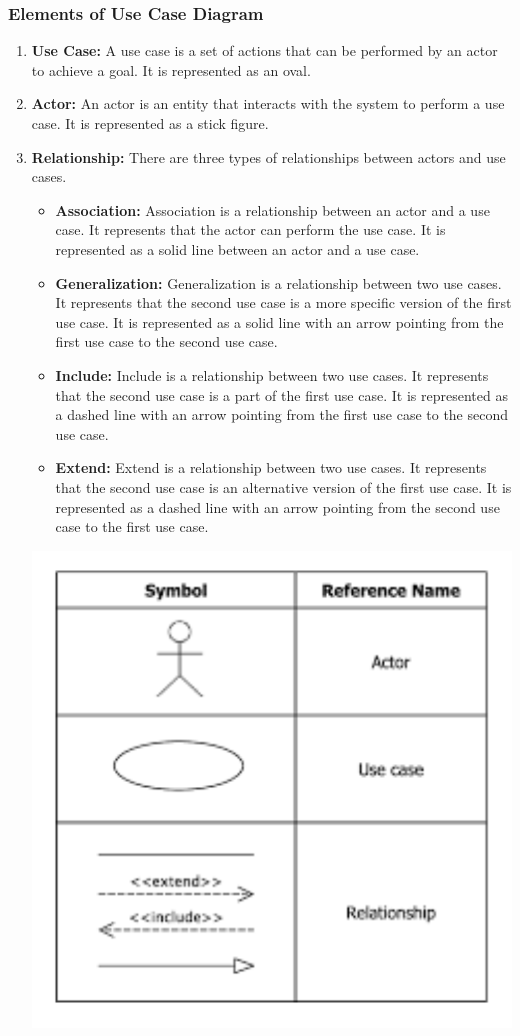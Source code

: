 \documentclass{article}
\begin{document}
\subsubsection{\textbf{Elements of Use Case Diagram}}
\begin{enumerate}
	\item \textbf{Use Case:} A use case is a set of actions that can be performed by an actor to achieve a goal. It is represented
	as an oval.
	\item \textbf{Actor:} An actor is an entity that interacts with the system to perform a use case. It is represented as a stick figure.
	\item \textbf{Relationship:} There are three types of relationships between actors and use cases.
	\begin{itemize}
		\item \textbf{Association:} Association is a relationship between an actor and a use case. It represents that the actor
		can perform the use case. It is represented as a solid line between an actor and a use case.
		\item \textbf{Generalization:} Generalization is a relationship between two use cases. It represents that the second use case is a more specific version of the first use case. It is represented as a solid line with an arrow pointing from the first use case to the second use case.
		\item \textbf{Include:} Include is a relationship between two use cases. It represents that the second use case is a part of the first use case. It is represented as a dashed line with an arrow pointing from the first use case to the second use case.
		\item \textbf{Extend:} Extend is a relationship between two use cases. It represents that the second use case is an alternative version of the first use case. It is represented as a dashed line with an arrow pointing from the second use case to the first use case.
	\end{itemize}
	\begin{center}
			\includegraphics[scale=0.7]{ass3.png}

\end{center}
\end{enumerate}
\end{document}
